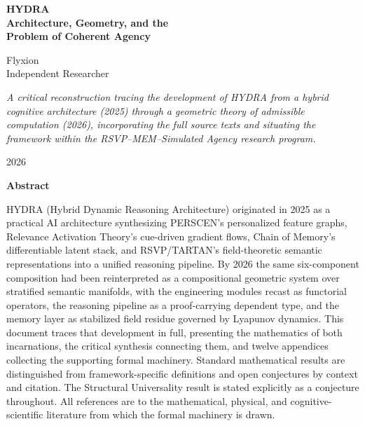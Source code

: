 \documentclass[12pt, a4paper]{article}
\theoremstyle{rsvpstyle}
\theoremstyle{definition}
\begin{document}
\begin{titlepage}
\thispagestyle{empty}
\vspace*{3.5cm}
\begin{center}
{\huge\bfseries\color{rsvpblue} HYDRA\\[0.6em]}
{\large\bfseries\color{midgray}
Architecture, Geometry, and the\\[0.3em]
Problem of Coherent Agency
}
\vspace{2.8cm}

{\large Flyxion}\\[0.3em]
{\small\color{midgray} Independent Researcher}

\vspace{1.8cm}
{\small\color{midgray}
\begin{minipage}{0.78\textwidth}
\centering\itshape
A critical reconstruction tracing the development of HYDRA from a
hybrid cognitive architecture (2025) through a geometric theory of admissible
computation (2026), incorporating the full source texts and situating the
framework within the RSVP--MEM--Simulated Agency research program.
\end{minipage}
}
\vspace{4cm}
{\small\color{midgray} 2026}
\end{center}
\end{titlepage}

\clearpage
\thispagestyle{empty}
\vspace*{2cm}
\begin{center}{\bfseries\color{rsvpblue} Abstract}\end{center}
\noindent
HYDRA (Hybrid Dynamic Reasoning Architecture) originated in 2025 as a practical
AI architecture synthesizing PERSCEN's personalized feature graphs, Relevance
Activation Theory's cue-driven gradient flows, Chain of Memory's differentiable
latent stack, and RSVP/TARTAN's field-theoretic semantic representations into
a unified reasoning pipeline. By 2026 the same six-component composition had
been reinterpreted as a compositional geometric system over stratified semantic
manifolds, with the engineering modules recast as functorial operators, the
reasoning pipeline as a proof-carrying dependent type, and the memory layer as
stabilized field residue governed by Lyapunov dynamics. This document traces
that development in full, presenting the mathematics of both incarnations,
the critical synthesis connecting them, and twelve appendices collecting
the supporting formal machinery. Standard mathematical results are distinguished
from framework-specific definitions and open conjectures by context and citation.
The Structural Universality result is stated explicitly as a conjecture throughout.
All references are to the mathematical, physical, and cognitive-scientific
literature from which the formal machinery is drawn.
\end{document}
